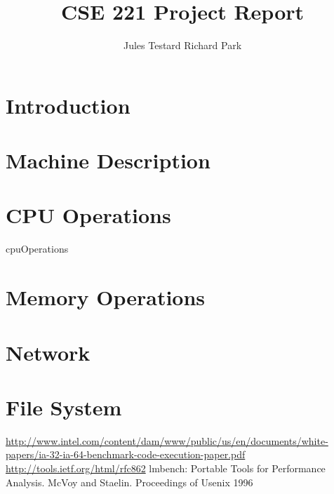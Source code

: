 \documentclass[11pt,twocolumn]{article}
\begin{document}
\title{CSE 221 Project Report}
\author{Jules Testard \quad Richard Park}
\maketitle

\section{Introduction}



\section{Machine Description}



\section{CPU Operations}

 {cpuOperations}

\section{Memory Operations}



\section{Network}



\section{File System}



\begin{thebibliography}{9}
    \url{http://www.intel.com/content/dam/www/public/us/en/documents/white-papers/ia-32-ia-64-benchmark-code-execution-paper.pdf}
    \url{http://tools.ietf.org/html/rfc862}
    lmbench: Portable Tools for Performance Analysis. McVoy and Staelin. Proceedings of Usenix 1996
\end{thebibliography}
\end{document}
